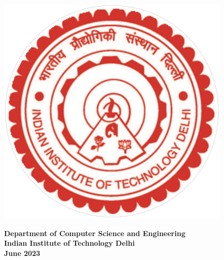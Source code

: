 \begin{titlepage}
\begin{center}
\begin{center}
\includegraphics[scale=0.6]{chapters/figures/iitd_logo.pdf} \\
\vspace{10pt}
\end{center}

\large{\textsf{\bf Department of Computer Science and Engineering\\}}
\Large{\textsf{\bf Indian Institute of Technology Delhi\\}}
\vspace{15pt}
\large{\textsf{\bf June 2023}}
\end{center}
\end{titlepage}

